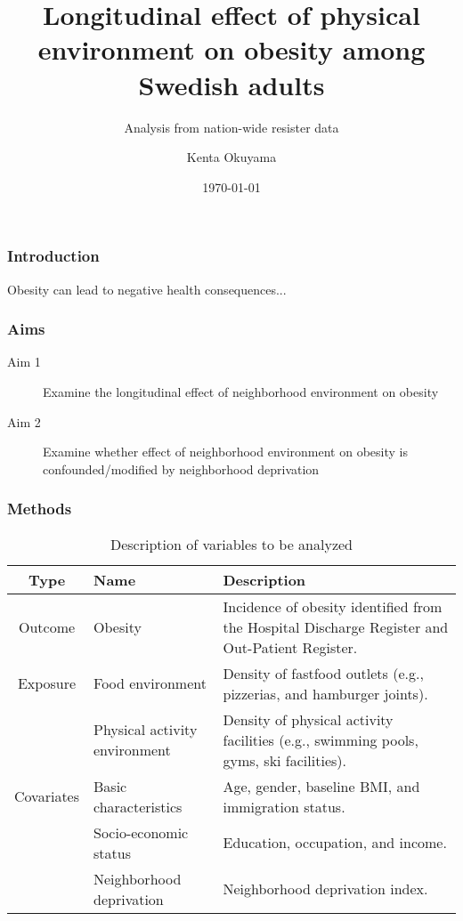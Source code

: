\documentclass{beamer}
\title{Longitudinal effect of physical environment on obesity among Swedish adults}
\subtitle{Analysis from nation-wide resister data}
\author{Kenta Okuyama}
\institute{Shimane University}
\date{\today}
\begin{document}
\begin{frame}
\titlepage
\end{frame}

\begin{frame}
\frametitle{Introduction}
Obesity can lead to negative health consequences...
\end{frame}

\begin{frame}
\frametitle{Aims}
\begin{description}
\item[Aim 1] Examine the longitudinal effect of neighborhood environment on obesity
\item[Aim 2] Examine whether effect of neighborhood environment on obesity is confounded/modified by neighborhood deprivation 
\end{description}
\end{frame}

\begin{frame}
\frametitle{Methods}
\begin{table}
\caption{Description of variables to be analyzed}
\label{table:aim1}
\centering
\begin{tabular}{ c l p{5cm} }
\hline
Type & Name & Description\\
\hline \hline
Outcome & Obesity & Incidence of obesity identified from the Hospital Discharge Register and Out-Patient Register.\\
Exposure & Food environment & Density of fastfood outlets (e.g., pizzerias, and hamburger joints).\\
                & Physical activity environment &  Density of physical activity facilities (e.g., swimming pools, gyms, ski facilities)\cite{kawakami2011health}.\\
Covariates & Basic characteristics & Age, gender, baseline BMI, and immigration status. \\
	          & Socio-economic status & Education, occupation, and income.\\
		 & Neighborhood deprivation & Neighborhood deprivation index.\\
\hline
\end{tabular}
\end{table}
\end{frame}
\end{document}
